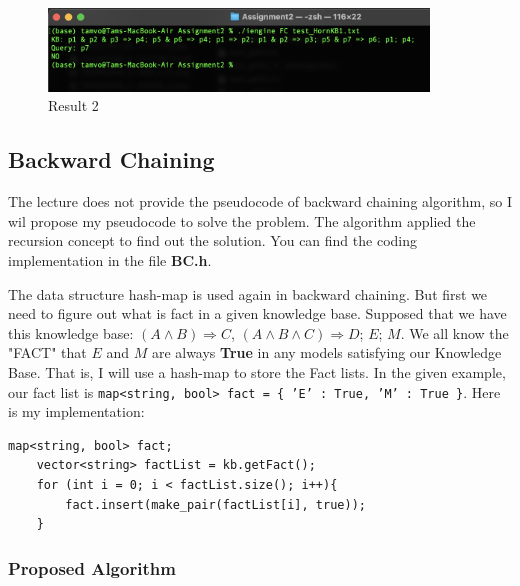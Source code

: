 \documentclass{assignment}
\begin{document}
\begin{figure}[h]
    \centering
    \includegraphics[width=0.9\textwidth]{./assets/test_HornKB1_FC.png}
    \caption{Result 2}
    \label{fig:fig6}
\end{figure}

\subsection{Backward Chaining}

The lecture does not provide the pseudocode of backward chaining algorithm, so I wil propose my pseudocode to solve the problem. The algorithm applied the recursion concept to find out the solution. You can find the coding implementation in the file \textbf{BC.h}.

The data structure hash-map is used again in backward chaining. But first we need to figure out what is fact in a given knowledge base. Supposed that we have this knowledge base: $(A \land B) \Rightarrow C$, $(A \land B \land C) \Rightarrow D$; $E$; $M$. We all know the "FACT" that $E$ and $M$ are always \textbf{True} in any models satisfying our Knowledge Base. That is, I will use a hash-map to store the Fact lists. In the given example, our fact list is \texttt{map<string, bool> fact = \{ 'E' : True, 'M' : True \}}. Here is my implementation:


\lstset{language=C++}
\begin{lstlisting}[caption={Define Fact}]
	map<string, bool> fact;	
	vector<string> factList = kb.getFact();
    for (int i = 0; i < factList.size(); i++){
        fact.insert(make_pair(factList[i], true));
    }
\end{lstlisting}

\newpage
\subsubsection{Proposed Algorithm}
\end{document}
